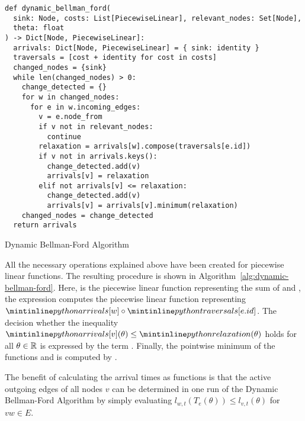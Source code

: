 \begin{algorithm}[h]
    \begin{verbatim}
def dynamic_bellman_ford(
  sink: Node, costs: List[PiecewiseLinear], relevant_nodes: Set[Node],
  theta: float
) -> Dict[Node, PiecewiseLinear]:
  arrivals: Dict[Node, PiecewiseLinear] = { sink: identity }
  traversals = [cost + identity for cost in costs]
  changed_nodes = {sink}
  while len(changed_nodes) > 0:
    change_detected = {}
    for w in changed_nodes:
      for e in w.incoming_edges:
        v = e.node_from
        if v not in relevant_nodes:
          continue
        relaxation = arrivals[w].compose(traversals[e.id])
        if v not in arrivals.keys():
          change_detected.add(v)
          arrivals[v] = relaxation
        elif not arrivals[v] <= relaxation:
          change_detected.add(v)
          arrivals[v] = arrivals[v].minimum(relaxation)
    changed_nodes = change_detected
  return arrivals
    \end{verbatim}
    \caption{Dynamic Bellman-Ford Algorithm}
    \label{alg:dynamic-bellman-ford}
\end{algorithm}

All the necessary operations explained above have been created for piecewise linear functions.
The resulting procedure is shown in Algorithm~\ref{alg:dynamic-bellman-ford}.
Here,  is the piecewise linear function representing the sum of  and , the expression  computes the piecewise linear function representing $\code{arrivals[w]}\circ \code{traversals[e.id]}$.
The decision whether the inequality $\code{arrivals[v]}(\theta) \leq \code{relaxation}(\theta)$ holds for all $\theta \in \mathbb{R}$ is expressed by the term . 
Finally, the pointwise minimum of the functions  and  is computed by .


The benefit of calculating the arrival times as functions is that the active outgoing edges of all nodes $v$ can be determined in one run of the Dynamic Bellman-Ford Algorithm by simply evaluating $l_{w,t}(T_e(\theta)) \leq  l_{v,t}(\theta)$ for $vw\in E$.